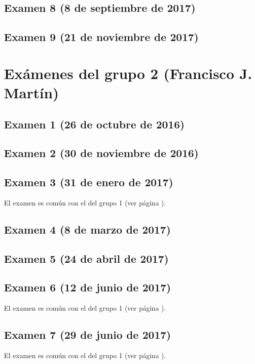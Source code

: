 \documentclass[a4paper,12pt,twoside]{book}
\begin{document}
\subsection{Examen 8 (8 de septiembre de 2017)}
  \label{examen_16_17_4_8}
\subsection{Examen 9 (21 de noviembre de 2017)}
  \label{examen_16_17_4_9}

\section{Exámenes del grupo 2 (Francisco J. Martín)}
\subsection{Examen 1 (26 de octubre de 2016)}
\subsection{Examen 2 (30 de noviembre de 2016)}
\subsection{Examen 3 (31 de enero de 2017)}
El examen es común con el del grupo 1 (ver página \pageref{examen_16_17_4_3}).
\subsection{Examen 4 (8 de marzo de 2017)}
\subsection{Examen 5 (24 de abril de 2017)}
\subsection{Examen 6 (12 de junio de 2017)}
El examen es común con el del grupo 1 (ver página \pageref{examen_16_17_4_6}).
\subsection{Examen 7 (29 de junio de 2017)}
El examen es común con el del grupo 1 (ver página \pageref{examen_16_17_4_7}).
\end{document}
